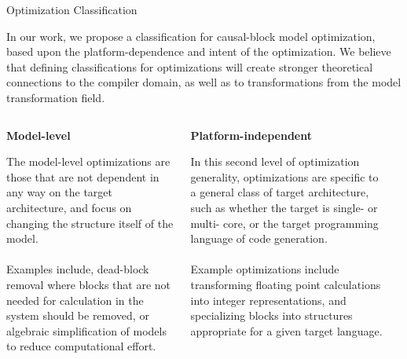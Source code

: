 \documentclass[final,hyperref={pdfpagelabels=false}]{beamer}
\begin{document}
\begin{frame}{}
    \begin{block}{Optimization Classification}
    \begin{center}
    \small
    In our work, we propose a classification for causal-block model optimization, based upon the platform-dependence and intent of the optimization. We believe that defining classifications for optimizations will create
    stronger theoretical connections to the compiler domain, as well as to transformations from the model
    transformation field.
    \end{center}
    \vspace{-1.5cm}
            \begin{columns}[t]
             \begin{column}{.19\linewidth}
           \begin{center}\textbf{Model-level}\end{center}
           \footnotesize
           The model-level optimizations are those that are not dependent in any way on the target architecture, and focus on changing the structure itself of the model. \\~\\Examples include, dead-block removal where
           blocks that are not needed for calculation in the system should be removed, or algebraic simplification of models to reduce computational effort.
           \end{column}
           \hspace{-1.2cm}\vrule\hspace{.05cm}
           \begin{column}{.19\linewidth}
          \begin{center}\textbf{Platform-independent}\end{center}
          \footnotesize
            In this second level of optimization generality, optimizations are specific to a general class
            of target architecture, such as whether the target is single- or multi- core, or the
            target programming language of code generation. \\~\\Example optimizations include transforming
            floating point calculations into integer representations, and specializing blocks into structures appropriate for a given
            target language.
            \end{column}
            \hspace{-1.2cm}\vrule\hspace{.05cm}
            \begin{column}{.16\linewidth}

\end{column}
\end{columns}
\end{block}
\end{frame}
\end{document}
